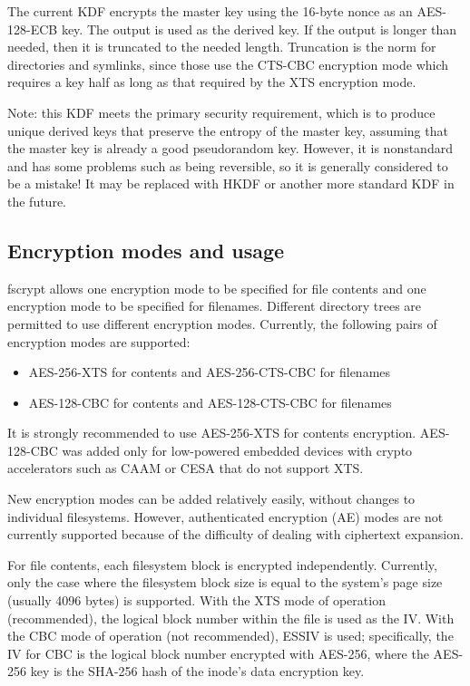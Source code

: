 \documentclass[a4paper,8pt,english]{sphinxmanual}
\begin{document}
The current KDF encrypts the master key using the 16-byte nonce as an
AES-128-ECB key.  The output is used as the derived key.  If the
output is longer than needed, then it is truncated to the needed
length.  Truncation is the norm for directories and symlinks, since
those use the CTS-CBC encryption mode which requires a key half as
long as that required by the XTS encryption mode.

Note: this KDF meets the primary security requirement, which is to
produce unique derived keys that preserve the entropy of the master
key, assuming that the master key is already a good pseudorandom key.
However, it is nonstandard and has some problems such as being
reversible, so it is generally considered to be a mistake!  It may be
replaced with HKDF or another more standard KDF in the future.


\subsection{Encryption modes and usage}
\label{filesystems/fscrypt:encryption-modes-and-usage}
fscrypt allows one encryption mode to be specified for file contents
and one encryption mode to be specified for filenames.  Different
directory trees are permitted to use different encryption modes.
Currently, the following pairs of encryption modes are supported:
\begin{itemize}
\item {} 
AES-256-XTS for contents and AES-256-CTS-CBC for filenames

\item {} 
AES-128-CBC for contents and AES-128-CTS-CBC for filenames

\end{itemize}

It is strongly recommended to use AES-256-XTS for contents encryption.
AES-128-CBC was added only for low-powered embedded devices with
crypto accelerators such as CAAM or CESA that do not support XTS.

New encryption modes can be added relatively easily, without changes
to individual filesystems.  However, authenticated encryption (AE)
modes are not currently supported because of the difficulty of dealing
with ciphertext expansion.

For file contents, each filesystem block is encrypted independently.
Currently, only the case where the filesystem block size is equal to
the system's page size (usually 4096 bytes) is supported.  With the
XTS mode of operation (recommended), the logical block number within
the file is used as the IV.  With the CBC mode of operation (not
recommended), ESSIV is used; specifically, the IV for CBC is the
logical block number encrypted with AES-256, where the AES-256 key is
the SHA-256 hash of the inode's data encryption key.
\end{document}
